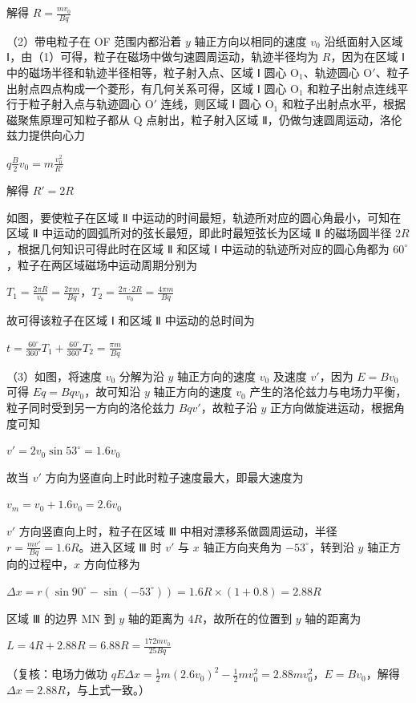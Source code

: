 \documentclass[\gkver]{gaokaozhenti}
\begin{document}
\begin{enumerate}
{解得 $R = \frac{mv_{0}}{Bq}$

（2）带电粒子在 OF 范围内都沿着 $y$ 轴正方向以相同的速度 $v_{0}$ 沿纸面射入区域 Ⅰ，由（1）可得，粒子在磁场中做匀速圆周运动，轨迹半径均为 $R$，因为在区域 Ⅰ 中的磁场半径和轨迹半径相等，粒子射入点、区域 Ⅰ 圆心 O$_{1}$、轨迹圆心 O$'$、粒子出射点四点构成一个菱形，有几何关系可得，区域 Ⅰ 圆心 O$_{1}$ 和粒子出射点连线平行于粒子射入点与轨迹圆心 O$'$ 连线，则区域 Ⅰ 圆心 O$_{1}$ 和粒子出射点水平，根据磁聚焦原理可知粒子都从 Q 点射出，粒子射入区域 Ⅱ，仍做匀速圆周运动，洛伦兹力提供向心力

$q\frac{B}{2}v_{0} = m\frac{v_{0}^{2}}{R'}$

解得 $R' = 2R$

如图，要使粒子在区域 Ⅱ 中运动的时间最短，轨迹所对应的圆心角最小，可知在区域 Ⅱ 中运动的圆弧所对的弦长最短，即此时最短弦长为区域 Ⅱ 的磁场圆半径 $2R$，根据几何知识可得此时在区域 Ⅱ 和区域 Ⅰ 中运动的轨迹所对应的圆心角都为 $60^\circ$，粒子在两区域磁场中运动周期分别为

$T_{1} = \frac{2\pi R}{v_{0}} = \frac{2\pi m}{Bq}$，$T_{2} = \frac{2\pi\cdot2R}{v_{0}} = \frac{4\pi m}{Bq}$


故可得该粒子在区域 Ⅰ 和区域 Ⅱ 中运动的总时间为

$t = \frac{60^\circ}{360^\circ}T_{1} + \frac{60^\circ}{360^\circ}T_{2} = \frac{\pi m}{Bq}$

（3）如图，将速度 $v_{0}$ 分解为沿 $y$ 轴正方向的速度 $v_{0}$ 及速度 $v'$，因为 $E = Bv_{0}$ 可得 $Eq = Bqv_{0}$，故可知沿 $y$ 轴正方向的速度 $v_{0}$ 产生的洛伦兹力与电场力平衡，粒子同时受到另一方向的洛伦兹力 $Bqv'$，故粒子沿 $y$ 正方向做旋进运动，根据角度可知

$v' = 2v_{0}\sin53^\circ = 1.6v_{0}$


故当 $v'$ 方向为竖直向上时此时粒子速度最大，即最大速度为

$v_{m} = v_{0} + 1.6v_{0} = 2.6v_{0}$

$v'$ 方向竖直向上时，粒子在区域 Ⅲ 中相对漂移系做圆周运动，半径 $r = \frac{mv'}{Bq} = 1.6R$。进入区域 Ⅲ 时 $v'$ 与 $x$ 轴正方向夹角为 $-53^\circ$，转到沿 $y$ 轴正方向的过程中，$x$ 方向位移为

$\Delta x = r(\sin90^\circ - \sin(-53^\circ)) = 1.6R\times(1 + 0.8) = 2.88R$

区域 Ⅲ 的边界 MN 到 $y$ 轴的距离为 $4R$，故所在的位置到 $y$ 轴的距离为

$L = 4R + 2.88R = 6.88R = \frac{172mv_{0}}{25Bq}$

（复核：电场力做功 $qE\Delta x = \frac{1}{2}m(2.6v_{0})^{2} - \frac{1}{2}mv_{0}^{2} = 2.88mv_{0}^{2}$，$E = Bv_{0}$，解得 $\Delta x = 2.88R$，与上式一致。）
}

\end{enumerate}
\end{document}
